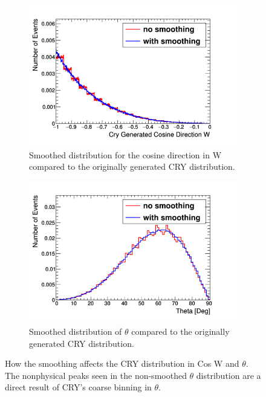 \begin{figure}[!h]
\centering
\begin{subfigure}{.5\textwidth}
  \centering
  \includegraphics[width=\linewidth]{Chapter4/Figs/Raster/CryPlots/CrySmoothingCosine.png}
  \captionsetup{width=.9\linewidth}
  \caption{Smoothed distribution for the cosine direction in W compared to the originally generated CRY distribution.}
  \label{subFig:CrySmoothingCosine}
\end{subfigure}%
\begin{subfigure}{.5\textwidth}
  \centering
  \includegraphics[width=\linewidth]{Chapter4/Figs/Raster/CryPlots/CrySmoothingTheta.png}
  \captionsetup{width=.9\linewidth}
  \caption{Smoothed distribution of $\theta$ compared to the originally generated CRY distribution.}
  \label{subFig:CrySmoothingTheta}
\end{subfigure}
\caption{How the smoothing affects the CRY distribution in Cos W and $\theta$. The nonphysical peaks seen in the non-smoothed $\theta$ distribution are a direct result of CRY's coarse binning in $\theta$.}
\label{fig:CrySmoothingCosTheta}
\end{figure}

